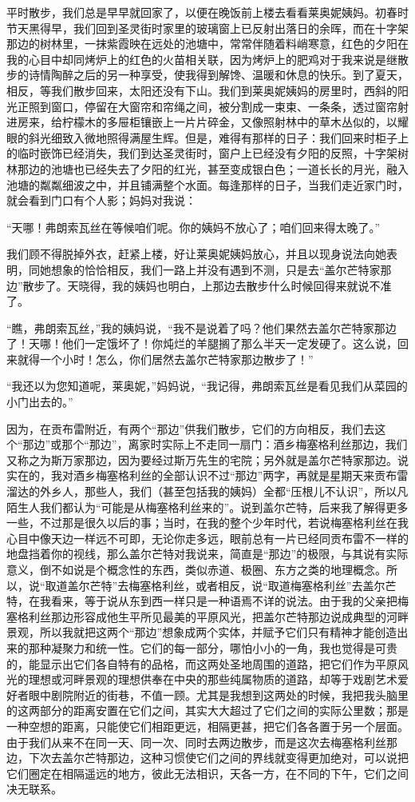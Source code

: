 \par 平时散步，我们总是早早就回家了，以便在晚饭前上楼去看看莱奥妮姨妈。初春时节天黑得早，我们回到圣灵街时家里的玻璃窗上已反射出落日的余晖，而在十字架那边的树林里，一抹紫霞映在远处的池塘中，常常伴随着料峭寒意，红色的夕阳在我的心目中却同烤炉上的红色的火苗相关联，因为烤炉上的肥鸡对于我来说是继散步的诗情陶醉之后的另一种享受，使我得到解馋、温暖和休息的快乐。到了夏天，相反，等我们散步回来，太阳还没有下山。我们到莱奥妮姨妈的房里时，西斜的阳光正照到窗口，停留在大窗帘和帘绳之间，被分割成一束束、一条条，透过窗帘射进房来，给柠檬木的多屉柜镶嵌上一片片碎金，又像照射林中的草木丛似的，以耀眼的斜光细致入微地照得满屋生辉。但是，难得有那样的日子：我们回来时柜子上的临时嵌饰已经消失，我们到达圣灵街时，窗户上已经没有夕阳的反照，十字架树林那边的池塘也已经失去了夕阳的红光，甚至变成银白色；一道长长的月光，融入池塘的粼粼细波之中，并且铺满整个水面。每逢那样的日子，当我们走近家门时，就会看到门口有个人影；妈妈对我说：
\par “天哪！弗朗索瓦丝在等候咱们呢。你的姨妈不放心了；咱们回来得太晚了。”
\par 我们顾不得脱掉外衣，赶紧上楼，好让莱奥妮姨妈放心，并且以现身说法向她表明，同她想象的恰恰相反，我们一路上并没有遇到不测，只是去“盖尔芒特家那边”散步了。天晓得，我的姨妈也明白，上那边去散步什么时候回得来就说不准了。
\par “瞧，弗朗索瓦丝，”我的姨妈说，“我不是说着了吗？他们果然去盖尔芒特家那边了！天哪！他们一定饿坏了！你炖烂的羊腿搁了那么半天一定发硬了。这么说，回来就得一个小时！怎么，你们居然去盖尔芒特家那边散步了！”
\par “我还以为您知道呢，莱奥妮，”妈妈说，“我记得，弗朗索瓦丝是看见我们从菜园的小门出去的。”
\par 因为，在贡布雷附近，有两个“那边”供我们散步，它们的方向相反，我们去这个“那边”或那个“那边”，离家时实际上不走同一扇门：酒乡梅塞格利丝那边，我们又称之为斯万家那边，因为要经过斯万先生的宅院；另外就是盖尔芒特家那边。说实在的，我对酒乡梅塞格利丝的全部认识不过“那边”两字，再就是星期天来贡布雷溜达的外乡人，那些人，我们（甚至包括我的姨妈）全都“压根儿不认识”，所以凡陌生人我们都认为“可能是从梅塞格利丝来的”。说到盖尔芒特，后来我了解得更多一些，不过那是很久以后的事；当时，在我的整个少年时代，若说梅塞格利丝在我心目中像天边一样远不可即，无论你走多远，眼前总有一片已经同贡布雷不一样的地盘挡着你的视线，那么盖尔芒特对我说来，简直是“那边”的极限，与其说有实际意义，倒不如说是个概念性的东西，类似赤道、极圈、东方之类的地理概念。所以，说“取道盖尔芒特”去梅塞格利丝，或者相反，说“取道梅塞格利丝”去盖尔芒特，在我看来，等于说从东到西一样只是一种语焉不详的说法。由于我的父亲把梅塞格利丝那边形容成他生平所见最美的平原风光，把盖尔芒特那边说成典型的河畔景观，所以我就把这两个“那边”想象成两个实体，并赋予它们只有精神才能创造出来的那种凝聚力和统一性。它们的每一部分，哪怕小小的一角，我也觉得是可贵的，能显示出它们各自特有的品格，而这两处圣地周围的道路，把它们作为平原风光的理想或河畔景观的理想供奉在中央的那些纯属物质的道路，却等于戏剧艺术爱好者眼中剧院附近的街巷，不值一顾。尤其是我想到这两处的时候，我把我头脑里的这两部分的距离安置在它们之间，其实大大超过了它们之间的实际公里数；那是一种空想的距离，只能使它们相距更远，相隔更甚，把它们各各置于另一个层面。由于我们从来不在同一天、同一次、同时去两边散步，而是这次去梅塞格利丝那边，下次去盖尔芒特那边，这种习惯使它们之间的界线就变得更加绝对，可以说把它们圈定在相隔遥远的地方，彼此无法相识，天各一方，在不同的下午，它们之间决无联系。
